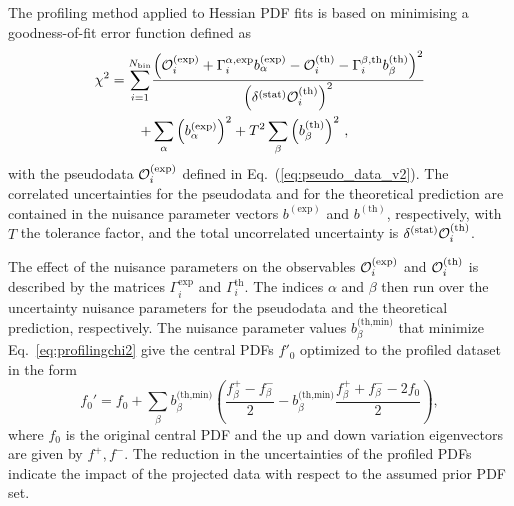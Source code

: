 The profiling method applied to Hessian PDF fits is based
on minimising a goodness-of-fit error function defined as
\begin{align}
\chi^2 = 
\sum_{i=1}^{N_{\textrm{bin}}} &
{{\left(  \mathcal{O}_i^{\rm (exp)}
            + \Gamma_i^{\alpha,\textrm{exp}}
              b_\alpha^{\textrm{(exp)}}
            - \mathcal{O}_i^{\rm (th)}
            - \Gamma_i^{\beta,\textrm{th}}
              b_\beta^{(\textrm{th})}
     \right)^2
     }\over { \left(\delta^{{\rm (stat)}}\mathcal{O}_i^{\rm (th)}\right)^2 }} \nonumber\\
+ &\sum_\alpha \left( b_\alpha^{(\textrm{exp})}\right)^2
+ T^2 \sum_\beta  \left( b_\beta^{\textrm{(th)}}\right) ^2 \, ,
\label{eq:profilingchi2}
\end{align}
with the pseudodata 
$\mathcal{O}_i^{\rm (exp)}$ defined in  Eq.~(\ref{eq:pseudo_data_v2}).
%
The correlated uncertainties for the pseudodata and for the theoretical prediction 
are contained in the nuisance parameter vectors $b^{(\textrm{exp})}$ and $b^{(\textrm{th})}$, respectively, with $T$ the tolerance factor, and the total uncorrelated uncertainty is $\delta^{{\rm (stat)}}\mathcal{O}_i^{\rm (th)}$.

The effect of the nuisance parameters
on the observables $\mathcal{O}_i^{\rm (exp)}$ and $\mathcal{O}_i^{\rm (th)}$
is described by the matrices $\Gamma_i^{\textrm{exp}}$ and $\Gamma_i^{\textrm{th}}$.
%
The indices $\alpha$ and $\beta$ then run over the uncertainty nuisance parameters for the pseudodata and the theoretical prediction, respectively.
%
The nuisance parameter values $b_\beta^{\textrm{(th,min)}}$ that minimize Eq.~\eqref{eq:profilingchi2} give the central PDFs $f'_0$ optimized to the profiled dataset in the form
\begin{equation}
f_0' = f_0
      + \sum_\beta b_\beta^{\textrm{(th,min)}} 
        \left(  \frac{f_\beta^+   -  f_\beta^- }{2}
              -    b_\beta^{\textrm{(th,min)}}
                \frac{f_\beta^+ + f_\beta^- - 2f_0}{2}
        \right),
\end{equation}
where $f_0$ is the original central PDF and the up and down variation eigenvectors are given by $f^+, f^-$.
%
The reduction in the uncertainties of the profiled PDFs indicate the impact
of the projected data with respect to the assumed prior PDF set.

